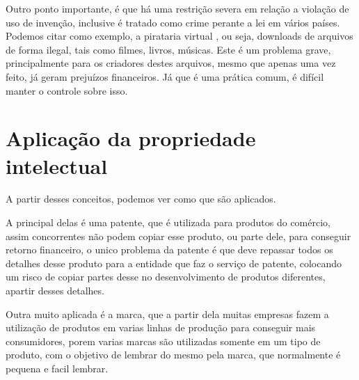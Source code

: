 \documentclass[12pt]{article}
\begin{document}
Outro ponto importante, é que há uma restrição severa em relação a violação de uso de invenção, inclusive é tratado como crime perante a lei em vários países. Podemos citar como exemplo, a pirataria virtual \cite{PIRATE}, ou seja, downloads de arquivos de forma ilegal, tais como filmes, livros, músicas. Este é um problema grave, principalmente para os criadores destes arquivos, mesmo que apenas uma vez feito, já geram prejuízos financeiros. Já que é uma prática comum, é difícil manter o controle sobre isso.

\section{Aplicação da propriedade intelectual} \label{sec:aplicacao}

A partir desses conceitos, podemos ver como que são aplicados.

A principal delas é uma patente, que é utilizada para produtos do comércio,
assim concorrentes não podem copiar esse produto, ou parte dele, para conseguir retorno
financeiro, o unico problema da patente é que deve repassar todos os detalhes desse produto
para a entidade que faz o serviço de patente, colocando um risco de copiar partes desse
no desenvolvimento de produtos diferentes, apartir desses detalhes.

Outra muito aplicada é a marca, que a partir dela muitas empresas fazem a utilização de
produtos em varias linhas de produção para conseguir mais consumidores, porem varias marcas
são utilizadas somente em um tipo de produto, com o objetivo de lembrar do mesmo pela marca,
que normalmente é pequena e facil lembrar.




\end{document}
